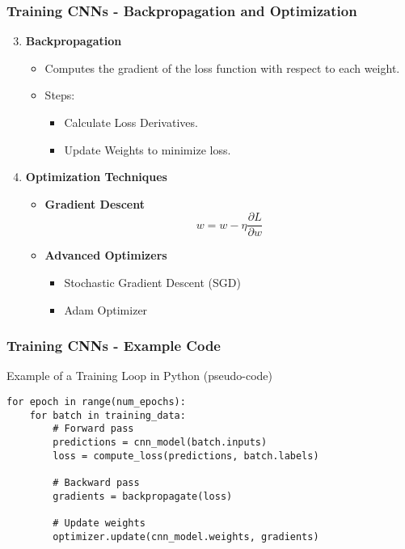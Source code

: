 \documentclass[aspectratio=169]{beamer}
\begin{document}
\begin{frame}[fragile]
    \frametitle{Training CNNs - Backpropagation and Optimization}
    \begin{enumerate}
        \setcounter{enumi}{2}
        \item \textbf{Backpropagation}
        \begin{itemize}
            \item Computes the gradient of the loss function with respect to each weight.
            \item Steps:
            \begin{itemize}
                \item Calculate Loss Derivatives.
                \item Update Weights to minimize loss.
            \end{itemize}
        \end{itemize}

        \item \textbf{Optimization Techniques}
        \begin{itemize}
            \item \textbf{Gradient Descent}
            \begin{equation}
                w = w - \eta \frac{\partial L}{\partial w}
            \end{equation}
            \item \textbf{Advanced Optimizers}
            \begin{itemize}
                \item Stochastic Gradient Descent (SGD)
                \item Adam Optimizer
            \end{itemize}
        \end{itemize}
    \end{enumerate}
\end{frame}

\begin{frame}[fragile]
    \frametitle{Training CNNs - Example Code}
    \begin{block}{Example of a Training Loop in Python (pseudo-code)}
    \begin{lstlisting}
for epoch in range(num_epochs):
    for batch in training_data:
        # Forward pass
        predictions = cnn_model(batch.inputs)
        loss = compute_loss(predictions, batch.labels)

        # Backward pass
        gradients = backpropagate(loss)

        # Update weights
        optimizer.update(cnn_model.weights, gradients)
    \end{lstlisting}
    \end{block}
\end{frame}
\end{document}
